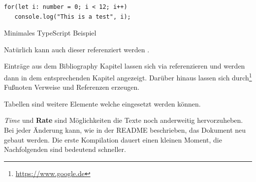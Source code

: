 \begin{listing}[htb]
   \begin{verbatim}
for(let i: number = 0; i < 12; i++)
   console.log("This is a test", i);
   \end{verbatim}
   \caption{Minimales TypeScript Beispiel}
   \ownsource
   \label{lis:ts-example}
\end{listing}

Natürlich kann auch dieser referenziert werden .

Einträge aus dem Bibliography Kapitel lassen sich via\autocite{tensorflowTut2022} referenzieren und werden dann in dem entsprechenden Kapitel angezeigt.
Darüber hinaus lassen sich durch\footnote{\url{https://www.google.de}} Fußnoten Verweise und Referenzen erzeugen.

Tabellen sind weitere Elemente welche eingesetzt werden können.

\begin{table}[htb]
    \footnotesize{
    }
    \caption{Tabelle mit Daten}
    \ownsource
    \label{tbl:table-with-data}
\end{table}

\textit{Time} und \textbf{Rate} sind Möglichkeiten die Texte noch anderweitig hervorzuheben.
Bei jeder Änderung kann, wie in der README beschrieben, das Dokument neu gebaut werden.
Die erste Kompilation dauert einen kleinen Moment, die Nachfolgenden sind bedeutend schneller.
